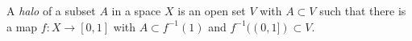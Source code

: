A \textit{halo} of a subset $A$ in a space $X$ is an open set $V$ with $A \subset V$ such that there is a map $f \colon X \to [0,1]$ with $A \subset f^{-1}(1)$ and $f^{-1}((0,1]) \subset V$.
